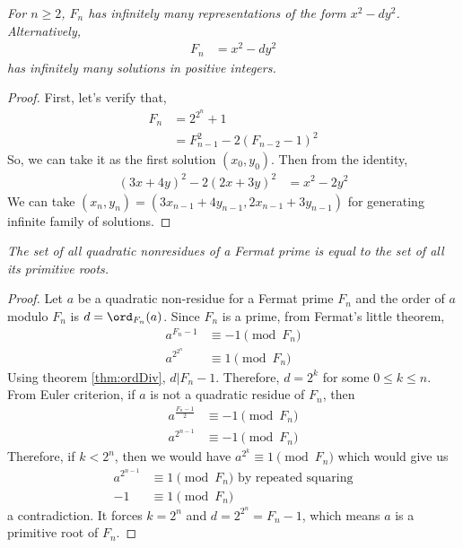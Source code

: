 \documentclass{subfile}
\begin{document}
		\begin{theorem}\slshape
			For $n\geq2$, $F_n$ has infinitely many representations of the form $x^2-dy^2$. Alternatively,
				\begin{align*}
					F_n & = x^2-dy^2
				\end{align*}
			has infinitely many solutions in positive integers.
		\end{theorem}
		
		\begin{proof}
			First, let's verify that,
				\begin{align*}
					F_n & = 2^{2^n}+1\\
						& = F_{n-1}^2-2(F_{n-2}-1)^2
				\end{align*}
			So, we can take it as the first solution $(x_0,y_0)$. Then from the identity,
				\begin{align*}
					(3x+4y)^2-2(2x+3y)^2 & = x^2-2y^2
				\end{align*}
			We can take $(x_n,y_n)=(3x_{n-1}+4y_{n-1},2x_{n-1}+3y_{n-1})$ for generating infinite family of solutions.
			
		\end{proof}
				
		\begin{theorem}\slshape
			The set of all quadratic nonresidues of a Fermat prime is equal to the set of all its primitive roots.
		\end{theorem}
		
		\begin{proof}
			Let $a$ be a quadratic non-residue for a Fermat prime $F_n$ and the order of $a$ modulo $F_n$ is $d=\ord_{F_n}(a)$. Since $F_n$ is a prime, from Fermat's little theorem,
				\begin{align*}
					a^{F_n-1} & \equiv-1\pmod {F_n}\\
					a^{2^{2^n}} & \equiv1\pmod{F_n}
				\end{align*}
			Using theorem \eqref{thm:ordDiv}, $d|F_n-1$. Therefore, $d=2^k$ for some $0\leq k\leq n$. From Euler criterion, if $a$ is not a quadratic residue of $F_n$, then
				\begin{align*}
					a^{\frac{F_n-1}{2}} &\equiv-1\pmod{F_n}\\
					a^{2^{n-1}} &\equiv-1\pmod{F_n}
				\end{align*}
			Therefore, if $k<2^n$, then we would have $a^{2^k}\equiv1\pmod{F_n}$ which would give us
				\begin{align*}
					a^{2^{n-1}} & \equiv1\pmod{F_n}\text{ by repeated squaring}\\
					-1 &\equiv1\pmod{F_n}
				\end{align*}
			a contradiction. It forces $k=2^n$ and $d=2^{2^n}=F_n-1$, which means $a$ is a primitive root of $F_n$.
			
		\end{proof}
				
\end{document}
